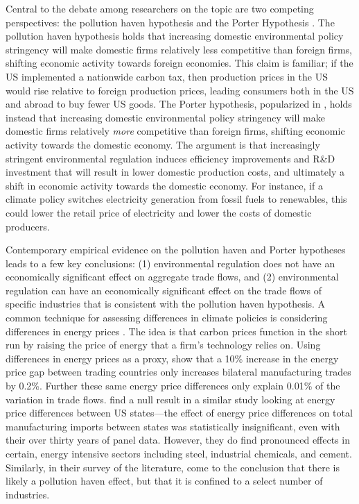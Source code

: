Central to the debate among researchers on the topic are two competing perspectives: the pollution haven hypothesis and the Porter Hypothesis \citep{dechezlepretre2020impacts}. The pollution haven hypothesis holds that increasing domestic environmental policy stringency will make domestic firms relatively less competitive than foreign firms, shifting economic activity towards foreign economies. This claim is familiar; if the US implemented a nationwide carbon tax, then production prices in the US would rise relative to foreign production prices, leading consumers both in the US and abroad to buy fewer US goods. The Porter hypothesis, popularized in \cite{porter1995toward}, holds instead that increasing domestic environmental policy stringency will make domestic firms relatively \emph{more} competitive than foreign firms, shifting economic activity towards the domestic economy. The argument is that increasingly stringent environmental regulation induces efficiency improvements and R\&D investment that will result in lower domestic production costs, and ultimately a shift in economic activity towards the domestic economy. For instance, if a climate policy switches electricity generation from fossil fuels to renewables, this could lower the retail price of electricity and lower the costs of domestic producers. 

Contemporary empirical evidence on the pollution haven and Porter hypotheses leads to a few key conclusions: (1) environmental regulation does not have an economically significant effect on aggregate trade flows, and (2) environmental regulation can have an economically significant effect on the trade flows of specific industries that is consistent with the pollution haven hypothesis. A common technique for assessing differences in climate policies is considering differences in energy prices \citep[see, for example,][]{fowlie2022mitigating}. The idea is that carbon prices function in the short run by raising the price of energy that a firm's technology relies on. Using differences in energy prices as a proxy, \cite{sato2015asymmetric} show that a 10\% increase in the energy price gap between trading countries only increases bilateral manufacturing trades by 0.2\%. Further these same energy price differences only explain 0.01\% of the variation in trade flows. \cite{aldy2015competitiveness} find a null result in a similar study looking at energy price differences between US states---the effect of energy price differences on total manufacturing imports between states was statistically insignificant, even with their over thirty years of panel data. However, they do find pronounced effects in certain, energy intensive sectors including steel, industrial chemicals, and cement. Similarly, in their survey of the literature, \cite{dechezlepretre2020impacts} come to the conclusion that there is likely a pollution haven effect, but that it is confined to a select number of industries.


